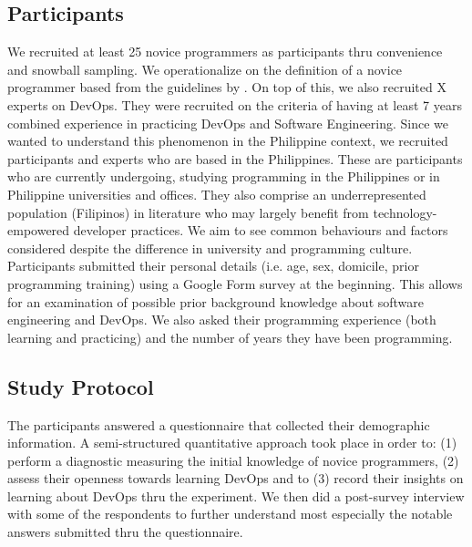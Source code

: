 \documentclass{sigchi}
\begin{document}
\subsection{Participants}
We recruited at least 25 novice programmers as participants thru convenience and snowball sampling. We operationalize on the definition of a novice programmer based from the guidelines by \cite{teague2014longitudinal}. On top of this, we also recruited X experts on DevOps. They were recruited on the criteria of having at least 7 years combined experience in practicing DevOps and Software Engineering. Since we wanted to understand this phenomenon in the Philippine context, we recruited participants and experts who are based in the Philippines. These are participants who are currently undergoing, studying programming in the Philippines or in Philippine universities and offices. They also comprise an underrepresented population (Filipinos) in literature who may largely benefit from technology-empowered developer practices. We aim to see common behaviours and factors considered despite the difference in university and programming culture. Participants submitted their personal details (i.e. age, sex, domicile, prior programming training) using a Google Form survey at the beginning. This allows for an examination of possible prior background knowledge about software engineering and DevOps. We also asked their programming experience (both learning and practicing) and the number of years they have been programming. 

\subsection{Study Protocol}
The participants answered a questionnaire that collected their demographic information. A semi-structured quantitative approach took place in order to: (1) perform a diagnostic measuring the initial knowledge of novice programmers, (2) assess their openness towards learning DevOps and to (3) record their insights on learning about DevOps thru the experiment. We then did a post-survey interview with some of the respondents to further understand most especially the notable answers submitted thru the questionnaire. 
\end{document}
